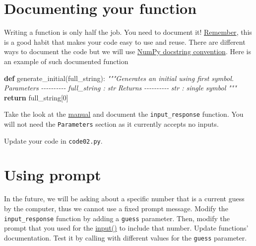 \documentclass[
]{book}
\newenvironment{Shaded}{\begin{snugshade}}{\end{snugshade}}
\newcommand{\CommentTok}[1]{\textcolor[rgb]{0.56,0.35,0.01}{\textit{#1}}}
\newcommand{\ControlFlowTok}[1]{\textcolor[rgb]{0.13,0.29,0.53}{\textbf{#1}}}
\newcommand{\DecValTok}[1]{\textcolor[rgb]{0.00,0.00,0.81}{#1}}
\newcommand{\KeywordTok}[1]{\textcolor[rgb]{0.13,0.29,0.53}{\textbf{#1}}}
\newcommand{\NormalTok}[1]{#1}
\begin{document}
\hypertarget{numpy-docstring}{%
\section{Documenting your function}\label{numpy-docstring}}

Writing a function is only half the job. You need to document it! \protect\hyperlink{programming-tips}{Remember}, this is a good habit that makes your code easy to use and reuse. There are different ways to document the code but we will use \href{https://numpydoc.readthedocs.io/en/latest/format.html\#docstring-standard}{NumPy docstring convention}. Here is an example of such documented function

\begin{Shaded}
\begin{Highlighting}[]
\KeywordTok{def}\NormalTok{ generate\_initial(full\_string):}
    \CommentTok{"""Generates an initial using first symbol.}
\CommentTok{    }
\CommentTok{    Parameters}
\CommentTok{    {-}{-}{-}{-}{-}{-}{-}{-}{-}{-}}
\CommentTok{    full\_string : str}
\CommentTok{    }
\CommentTok{    Returns}
\CommentTok{    {-}{-}{-}{-}{-}{-}{-}{-}{-}{-}}
\CommentTok{    str : single symbol}
\CommentTok{    """}
    \ControlFlowTok{return}\NormalTok{ full\_string[}\DecValTok{0}\NormalTok{]}
\end{Highlighting}
\end{Shaded}

Take the look at the \href{https://numpydoc.readthedocs.io/en/latest/format.html\#docstring-standard}{manual} and document the \texttt{input\_response} function. You will not need the \texttt{Parameters} section as it currently accepts no inputs.

Update your code in \texttt{code02.py}.

\hypertarget{using-prompt}{%
\section{Using prompt}\label{using-prompt}}

In the future, we will be asking about a specific number that is a current guess by the computer, thus we cannot use a fixed prompt message. Modify the \texttt{input\_response} function by adding a \texttt{guess} parameter. Then, modify the prompt that you used for the \href{https://docs.python.org/3/library/functions.html\#input}{input()} to include that number. Update functions' documentation. Test it by calling with different values for the \texttt{guess} parameter.
\end{document}

